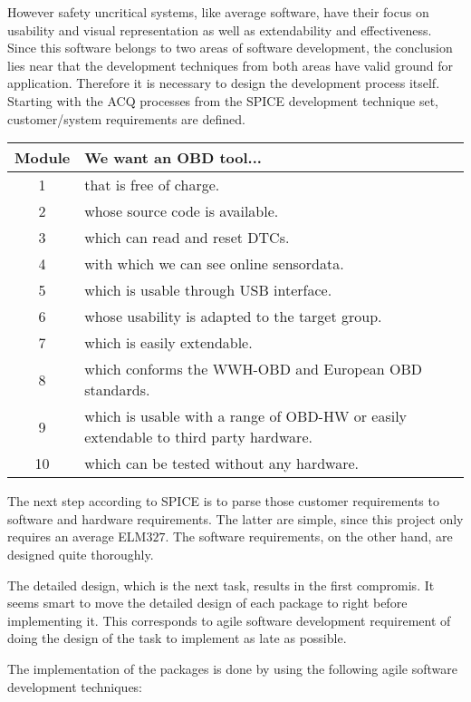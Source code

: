 However safety uncritical systems, like average software, have their focus on usability and visual representation as well as extendability and 
effectiveness. Since this software belongs to two areas of software development, the conclusion lies near that the development techniques 
from both areas have valid ground for application. Therefore it is necessary to design the development process itself. Starting with the ACQ 
processes from the SPICE development technique set, customer/system requirements are defined.

\begin{tabular}{| c | p{12cm} |}
 \hline
 \textbf{Module} & \textbf{We want an OBD tool...} \\
  \hline
  1 & that is free of charge. \\
  \hline
  2 & whose source code is available. \\
  \hline
  3 & which can read and reset DTCs. \\
  \hline
  4 & with which we can see online sensordata. \\
  \hline
  5 & which is usable through USB interface. \\
  \hline
  6 & whose usability is adapted to the target group. \\
  \hline
  7 & which is easily extendable. \\
  \hline
  8 & which conforms the WWH-OBD and European OBD standards. \\
  \hline
  9 & which is usable with a range of OBD-HW or easily extendable to third party hardware. \\
  \hline
  10 & which can be tested without any hardware. \\
  \hline
\end{tabular}

The next step according to SPICE is to parse those customer requirements to software and hardware requirements. The latter are simple, since 
this project only requires an average ELM$327$. The software requirements, on the other hand, are designed quite thoroughly.


The detailed design, which is the next task, results in the first compromis. It seems smart to move the detailed design of each package 
to right before implementing it. This corresponds to agile software development requirement of doing the design of the task to implement as late 
as possible.

The implementation of the packages is done by using the following agile software development techniques:

